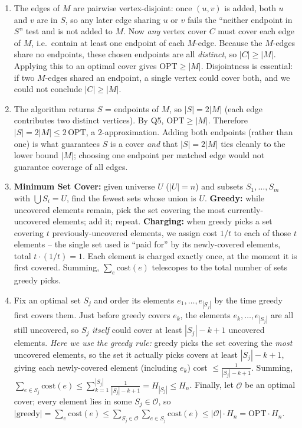 \documentclass[11pt]{article}
\begin{document}
\begin{enumerate}[label=\textbf{A\arabic*.}, leftmargin=2.2em]
\item The edges of $M$ are pairwise vertex-disjoint: once $(u,v)$ is added, both $u$ and
$v$ are in $S$, so any later edge sharing $u$ or $v$ fails the ``neither endpoint in $S$''
test and is not added to $M$. Now \emph{any} vertex cover $C$ must cover each edge of $M$,
i.e.\ contain at least one endpoint of each $M$-edge. Because the $M$-edges share no
endpoints, these chosen endpoints are all \emph{distinct}, so $|C| \ge |M|$. Applying this
to an optimal cover gives $\mathrm{OPT} \ge |M|$. Disjointness is essential: if two
$M$-edges shared an endpoint, a single vertex could cover both, and we could not conclude
$|C| \ge |M|$.

\item The algorithm returns $S$ = endpoints of $M$, so $|S| = 2|M|$ (each edge contributes
two distinct vertices). By Q5, $\mathrm{OPT} \ge |M|$. Therefore $|S| = 2|M| \le
2\,\mathrm{OPT}$, a $2$-approximation. Adding both endpoints (rather than one) is what
guarantees $S$ is a cover \emph{and} that $|S| = 2|M|$ ties cleanly to the lower bound
$|M|$; choosing one endpoint per matched edge would not guarantee coverage of all edges.

\item \textbf{Minimum Set Cover:} given universe $U$ ($|U| = n$) and subsets $S_1, \ldots,
S_m$ with $\bigcup S_i = U$, find the fewest sets whose union is $U$. \textbf{Greedy:}
while uncovered elements remain, pick the set covering the most currently-uncovered
elements; add it; repeat. \textbf{Charging:} when greedy picks a set covering $t$
previously-uncovered elements, we assign cost $1/t$ to each of those $t$ elements -- the
single set used is ``paid for'' by its newly-covered elements, total $t \cdot (1/t) = 1$.
Each element is charged exactly once, at the moment it is first covered. Summing,
$\sum_{e} \mathrm{cost}(e)$ telescopes to the total number of sets greedy picks.

\item Fix an optimal set $S_j$ and order its elements $e_1, \ldots, e_{|S_j|}$ by the time
greedy first covers them. Just before greedy covers $e_k$, the elements $e_k, \ldots,
e_{|S_j|}$ are all still uncovered, so $S_j$ \emph{itself} could cover at least $|S_j| - k
+ 1$ uncovered elements. \emph{Here we use the greedy rule:} greedy picks the set covering
the \emph{most} uncovered elements, so the set it actually picks covers at least $|S_j| - k
+ 1$, giving each newly-covered element (including $e_k$) cost $\le \frac{1}{|S_j|-k+1}$.
Summing, $\sum_{e\in S_j}\mathrm{cost}(e) \le \sum_{k=1}^{|S_j|}\frac{1}{|S_j|-k+1} =
H_{|S_j|} \le H_n$. Finally, let $\mathcal O$ be an optimal cover; every element lies in
some $S_j \in \mathcal O$, so $|\text{greedy}| = \sum_e \mathrm{cost}(e) \le \sum_{S_j \in
\mathcal O}\sum_{e \in S_j}\mathrm{cost}(e) \le |\mathcal O|\cdot H_n = \mathrm{OPT}\cdot
H_n$.


\end{enumerate}
\end{document}
